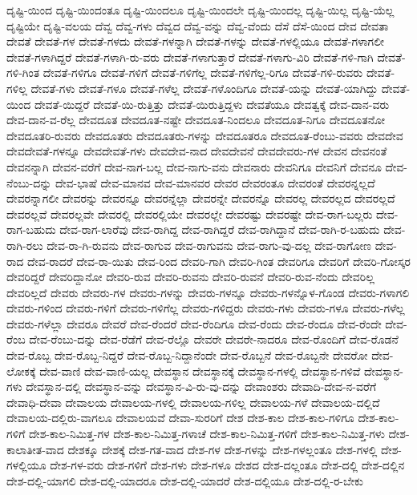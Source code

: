 {ದೃಷ್ಟಿ-ಯಿಂದ
ದೃಷ್ಟಿ-ಯಿಂದಂತೂ
ದೃಷ್ಟಿ-ಯಿಂದಲೂ
ದೃಷ್ಟಿ-ಯಿಂದಲೇ
ದೃಷ್ಟಿ-ಯಿಂದಲ್ಲ
ದೃಷ್ಟಿ-ಯಿಲ್ಲ
ದೃಷ್ಟಿ-ಯೆಲ್ಲ
ದೃಷ್ಟಿಯೇ
ದೃಷ್ಟಿ-ವಲಯ
ದೆವ್ವ
ದೆವ್ವ-ಗಳು
ದೆವ್ವದ
ದೆವ್ವ-ವನ್ನು
ದೆವ್ವ-ವೆಂದು
ದೆಸೆ
ದೆಸೆ-ಯಿಂದ
ದೇವ
ದೇವತಾ
ದೇವತೆ
ದೇವತೆ-ಗಳ
ದೇವತೆ-ಗಳದು
ದೇವತೆ-ಗಳನ್ನಾಗಿ
ದೇವತೆ-ಗಳನ್ನು
ದೇವತೆ-ಗಳಲ್ಲಿಯೂ
ದೇವತೆ-ಗಳಾಗಲೀ
ದೇವತೆ-ಗಳಾಗಿದ್ದರೆ
ದೇವತೆ-ಗಳಾಗಿ-ರು-ವರು
ದೇವತೆ-ಗಳಾಗುತ್ತಾರೆ
ದೇವತೆ-ಗಳಾಗು-ವಿರಿ
ದೇವತೆ-ಗಳಿ-ಗಾಗಿ
ದೇವತೆ-ಗಳಿ-ಗಿಂತ
ದೇವತೆ-ಗಳಿಗೂ
ದೇವತೆ-ಗಳಿಗೆ
ದೇವತೆ-ಗಳಿಗೆಲ್ಲ
ದೇವತೆ-ಗಳಿಗೆಲ್ಲ-ರಿಗೂ
ದೇವತೆ-ಗಳಿ-ರುವರು
ದೇವತೆ-ಗಳಿಲ್ಲ
ದೇವತೆ-ಗಳು
ದೇವತೆ-ಗಳೂ
ದೇವತೆ-ಗಳೆಲ್ಲ
ದೇವತೆ-ಗಳೊಂದಿಗೂ
ದೇವತೆ-ಯನ್ನು
ದೇವತೆ-ಯಾಗಿದ್ದು
ದೇವತೆ-ಯಿಂದ
ದೇವತೆ-ಯಿದ್ದರೆ
ದೇವತೆ-ಯಿ-ರುತ್ತಿತ್ತು
ದೇವತೆ-ಯಿರುತ್ತಿದ್ದಳು
ದೇವತೆಯೂ
ದೇವತ್ವಕ್ಕೆ
ದೇವ-ದಾನ-ವರು
ದೇವ-ದಾನ-ವ-ರೆಲ್ಲ
ದೇವದೂತ
ದೇವದೂತ-ನಷ್ಟೇ
ದೇವದೂತ-ನಿಂದಲೂ
ದೇವದೂತ-ನಿಗೂ
ದೇವದೂತನೋ
ದೇವದೂತರಿ-ರುವರು
ದೇವದೂತರು
ದೇವದೂತರು-ಗಳನ್ನು
ದೇವದೂತರೂ
ದೇವದೂತ-ರೆಂಬು-ವವರು
ದೇವದೇವ
ದೇವದೇವತೆ-ಗಳನ್ನೂ
ದೇವದೇವತೆ-ಗಳು
ದೇವದೇವ-ನಾದ
ದೇವದೇವನೆ
ದೇವದೇವರು-ಗಳ
ದೇವನ
ದೇವನಂತೆ
ದೇವನನ್ನಾಗಿ
ದೇವನ-ವರೆಗೆ
ದೇವ-ನಾಗ-ಬಲ್ಲ
ದೇವ-ನಾಗು-ವನು
ದೇವನಾರು
ದೇವನಿಗೂ
ದೇವನಿಗೆ
ದೇವನೂ
ದೇವ-ನೆಂಬು-ದನ್ನು
ದೇವ-ಭಾಷೆ
ದೇವ-ಮಾನವ
ದೇವ-ಮಾನವರ
ದೇವರ
ದೇವರಂತೂ
ದೇವರಂತೆ
ದೇವರನ್ನಲ್ಲದೆ
ದೇವರನ್ನಾಗಲೀ
ದೇವರನ್ನು
ದೇವರನ್ನೂ
ದೇವರನ್ನೆಲ್ಲಾ
ದೇವರನ್ನೇ
ದೇವರನ್ನೊ
ದೇವರಲ್ಲ
ದೇವರಲ್ಲದ
ದೇವರಲ್ಲದೆ
ದೇವರಲ್ಲವೆ
ದೇವರಲ್ಲವೇ
ದೇವರಲ್ಲಿ
ದೇವರಲ್ಲಿಯೇ
ದೇವರಲ್ಲೇ
ದೇವರಷ್ಟು
ದೇವರಷ್ಟೇ
ದೇವ-ರಾಗ-ಬಲ್ಲರು
ದೇವ-ರಾಗ-ಬಹುದು
ದೇವ-ರಾಗ-ಲಾರೆವು
ದೇವ-ರಾಗಿದ್ದ
ದೇವ-ರಾಗಿದ್ದರೆ
ದೇವ-ರಾಗಿದ್ದಾನೆ
ದೇವ-ರಾಗಿ-ರ-ಬಹುದು
ದೇವ-ರಾಗಿ-ರಲು
ದೇವ-ರಾ-ಗಿ-ರುವನು
ದೇವ-ರಾಗುವ
ದೇವ-ರಾಗುವನು
ದೇವ-ರಾಗು-ವು-ದಲ್ಲ
ದೇವ-ರಾಗೋಣ
ದೇವ-ರಾದ
ದೇವ-ರಾದರೆ
ದೇವ-ರಾ-ಯಿತು
ದೇವ-ರಿಂದ
ದೇವರಿ-ಗಾಗಿ
ದೇವರಿ-ಗಿಂತ
ದೇವರಿಗೂ
ದೇವರಿಗೆ
ದೇವರಿ-ಗೋಸ್ಕರ
ದೇವರಿದ್ದರೆ
ದೇವರಿದ್ದಾನೋ
ದೇವರಿ-ರುವ
ದೇವರಿ-ರುವನು
ದೇವರಿ-ರುವನೆ
ದೇವರಿ-ರುವ-ನೆಂದು
ದೇವರಿಲ್ಲ
ದೇವರಿಲ್ಲದೆ
ದೇವರು
ದೇವರು-ಗಳ
ದೇವರು-ಗಳನ್ನು
ದೇವರು-ಗಳನ್ನೂ
ದೇವರು-ಗಳನ್ನೊಳ-ಗೊಂಡ
ದೇವರು-ಗಳಾಗಲಿ
ದೇವರು-ಗಳಿಂದ
ದೇವರು-ಗಳಿಗೆ
ದೇವರು-ಗಳಿಗೆಲ್ಲ
ದೇವರು-ಗಳಿದ್ದರು
ದೇವರು-ಗಳು
ದೇವರು-ಗಳೂ
ದೇವರು-ಗಳೆಲ್ಲ
ದೇವರು-ಗಳೆಲ್ಲಾ
ದೇವರೂ
ದೇವರೆ
ದೇವ-ರೆಂದರೆ
ದೇವ-ರೆಂದಿಗೂ
ದೇವ-ರೆಂದು
ದೇವ-ರೆಂದೂ
ದೇವ-ರೆಂದೇ
ದೇವ-ರೆಂಬ
ದೇವ-ರೆಂಬು-ದನ್ನು
ದೇವ-ರೆಡೆಗೆ
ದೇವ-ರೆಲ್ಲೊ
ದೇವರೇ
ದೇವರೇ-ನಾದರೂ
ದೇವ-ರೊಂದಿಗೆ
ದೇವ-ರೊಡನೆ
ದೇವ-ರೊಬ್ಬ
ದೇವ-ರೊಬ್ಬ-ನಿದ್ದರೆ
ದೇವ-ರೊಬ್ಬ-ನಿದ್ದಾನೆಂದೇ
ದೇವ-ರೊಬ್ಬನೆ
ದೇವ-ರೊಬ್ಬನೇ
ದೇವರೋ
ದೇವ-ಲೋಕಕ್ಕೆ
ದೇವ-ವಾಣಿ
ದೇವ-ವಾಣಿ-ಯಲ್ಲ
ದೇವಸ್ಥಾನ
ದೇವಸ್ಥಾನಕ್ಕೆ
ದೇವಸ್ಥಾನ-ಗಳಲ್ಲಿ
ದೇವಸ್ಥಾನ-ಗಳಿವೆ
ದೇವಸ್ಥಾನ-ಗಳು
ದೇವಸ್ಥಾನ-ದಲ್ಲಿ
ದೇವಸ್ಥಾನ-ವನ್ನು
ದೇವಸ್ಥಾನ-ವಿ-ರು-ವು-ದನ್ನು
ದೇವಾಂಶರು
ದೇವಾದಿ-ದೇವ-ನ-ವರೆಗೆ
ದೇವಾಧಿ-ದೇವಾ
ದೇವಾಲಯ
ದೇವಾಲಯ-ಗಳಲ್ಲಿ
ದೇವಾಲಯ-ಗಳಿಲ್ಲ
ದೇವಾಲಯ-ಗಳೆ
ದೇವಾಲಯ-ದಲ್ಲಿದೆ
ದೇವಾಲಯ-ದಲ್ಲಿರು-ವಾಗಲೂ
ದೇವಾಲಯವೆ
ದೇವಾ-ಸುರರಿಗೆ
ದೇಶ
ದೇಶ-ಕಾಲ
ದೇಶ-ಕಾಲ-ಗಳಿಗೂ
ದೇಶ-ಕಾಲ-ಗಳಿಗೆ
ದೇಶ-ಕಾಲ-ನಿಮಿತ್ತ-ಗಳ
ದೇಶ-ಕಾಲ-ನಿಮಿತ್ತ-ಗಳಾಚೆ
ದೇಶ-ಕಾಲ-ನಿಮಿತ್ತ-ಗಳಿಗೆ
ದೇಶ-ಕಾಲ-ನಿಮಿತ್ತ-ಗಳು
ದೇಶ-ಕಾಲಾತೀತ-ವಾದ
ದೇಶಕ್ಕೂ
ದೇಶಕ್ಕೆ
ದೇಶ-ಗತ-ವಾದ
ದೇಶ-ಗಳ
ದೇಶ-ಗಳನ್ನು
ದೇಶ-ಗಳಲ್ಲಂತೂ
ದೇಶ-ಗಳಲ್ಲಿ
ದೇಶ-ಗಳಲ್ಲಿಯೂ
ದೇಶ-ಗಳ-ವರು
ದೇಶ-ಗಳಿಗೆ
ದೇಶ-ಗಳು
ದೇಶ-ಗಳೂ
ದೇಶದ
ದೇಶ-ದಲ್ಲಂತೂ
ದೇಶ-ದಲ್ಲಿ
ದೇಶ-ದಲ್ಲಿನ
ದೇಶ-ದಲ್ಲಿ-ಯಾಗಲಿ
ದೇಶ-ದಲ್ಲಿ-ಯಾದರೂ
ದೇಶ-ದಲ್ಲಿ-ಯಾದರೆ
ದೇಶ-ದಲ್ಲಿಯೂ
ದೇಶ-ದಲ್ಲಿ-ರ-ಬೇಕು
}
